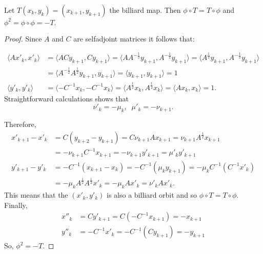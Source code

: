 \begin{proposition}
    \label{prop:veselov}
    Let $T(x_k,y_{k})=(x_{k+1},y_{k+1})$ the billiard map.
    Then $\phi\circ T=T\circ \phi$ and $\phi^2=\phi\circ\phi=-T.$
\end{proposition}
\begin{proof} Since $A $ and $C$ are selfadjoint matrices it follows that:
 
\begin{align*}
    \langle A x'_k,x'_k\rangle & =\langle A  Cy_{k+1},Cy_{k+1}\rangle= \langle A  A^{-\frac{1}{2} }y_{k+1},A^{-\frac{1}{2} }y_{k+1}\rangle=\langle A^{\frac{1}{2}  } y_{k+1},A^{-\frac{1}{2} } y_{k+1}\rangle\\
    &=\langle A^{-\frac{1}{2} }A^{ \frac{1}{2} } y_{k+1} ,  y_{k+1}\rangle=\langle y_{k+1} ,  y_{k+1}\rangle=1\\
   \langle y'_k,y'_k\rangle & = \langle -C^{-1}  x_{k},-C^{-1}x_{k}\rangle   = \langle A^{\frac{1}{2}}  x_{k },A^{\frac{1}{2} } x_{k }\rangle = \langle A   x_{k },  x_{k }\rangle=1.
\end{align*}
Straightforward calculations shows that
\[ \nu'_k=-\mu_k, \;\; \mu'_k=-\nu_{k+1}.\]

\noindent Therefore,
\begin{align*}
     x'_{k+1}-x'_k&=C(y_{k+2}-y_{k+1})=C\nu_{k+1}Ax_{k+1}=\nu_{k+1}A^{\frac{1}{2}}x_{k+1}\\
     &=-\nu_{k+1}C^{-1} x_{k+1} 
    = -\nu_{k+1} y'_{k+1}
     =\mu'_ky'_{k+1}\\ y'_{k+1}-y'_k&=-C^{-1}(x_{k+1}-x_k)=-C^{-1}(\mu_ky_{k+1})=-\mu_kC^{-1}(C^{-1} x'_k)\\
     &=-\mu_k A^{\frac{1}{2}}A^{\frac{1}{2}} x'_k=-\mu_kAx'_k=\nu'_kA x'_k. \end{align*}
This means that the $(x'_k,y'_k)$ is also a billiard orbit and so
 $\phi\circ T= T\circ \phi.$
Finally,
\begin{align*}
    x''_k&=Cy'_{k+1}=C(-C^{-1} x_{k+1})=-x_{k+1}\\
    y''_k&=-C^{-1}x'_k=-C^{-1}(Cy_{k+1})=-y_{k+1}
\end{align*}
So, $\phi^2=-T.$
\end{proof}